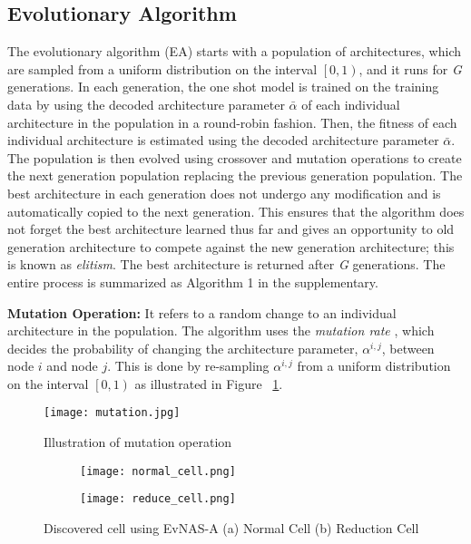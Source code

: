 \documentclass[final]{cvpr}
\begin{document}
\subsection{Evolutionary Algorithm}
The evolutionary algorithm (EA) starts with a population of architectures, which are sampled
from a uniform distribution on the interval $\left[0,1\right)$, and it runs for \textit{G}
generations. In each generation, the one shot model is trained on the training data by using the
decoded architecture parameter $\bar{\alpha}$ of each individual architecture in the population in
a round-robin fashion. Then, the fitness of each individual architecture is estimated using the
decoded architecture parameter $\bar{\alpha}$. The population is then evolved using crossover and
mutation operations to create the next generation population replacing the previous generation
population. The best architecture in each generation does not undergo any modification and is
automatically copied to the next generation. This ensures that the algorithm does not forget the
best architecture learned thus far and gives an opportunity to old generation architecture to
compete against the new generation architecture; this is known as \textit{elitism}. The best
architecture is returned after \textit{G} generations. The entire process is summarized as
Algorithm 1 in the supplementary.

\textbf{Mutation Operation:} It refers to a random change to an individual
architecture in the population. The algorithm uses the \textit{mutation rate}
\cite{eiben2003introduction}, which decides the probability of changing the
architecture parameter, $\alpha^{i,j}$, between
node $i$ and node $j$. This is done by re-sampling $\alpha^{i,j}$ from a 
uniform distribution on the interval $\left[0,1\right)$ as illustrated in 
Figure ~\ref{fig:mutation}. 

\begin{figure}[h]
\begin{center}
       \texttt{[image: mutation.jpg]}
  \end{center}
  \caption{Illustration of mutation operation}
  \label{fig:mutation}
  \end{figure}

\begin{figure*}[t]
  \centering
\begin{subfigure}{0.45\linewidth}
    \texttt{[image: normal\_cell.png]}
    \caption{}
    \label{fig:normal}
  \end{subfigure}
  \quad \quad
  \begin{subfigure}{0.45\linewidth}
    \texttt{[image: reduce\_cell.png]}
    \caption{}
    \label{fig:reduce}
  \end{subfigure}
  \caption{Discovered cell using EvNAS-A (a) Normal Cell (b) Reduction Cell}
  \label{discovered_cells}
\end{figure*}
\end{document}
